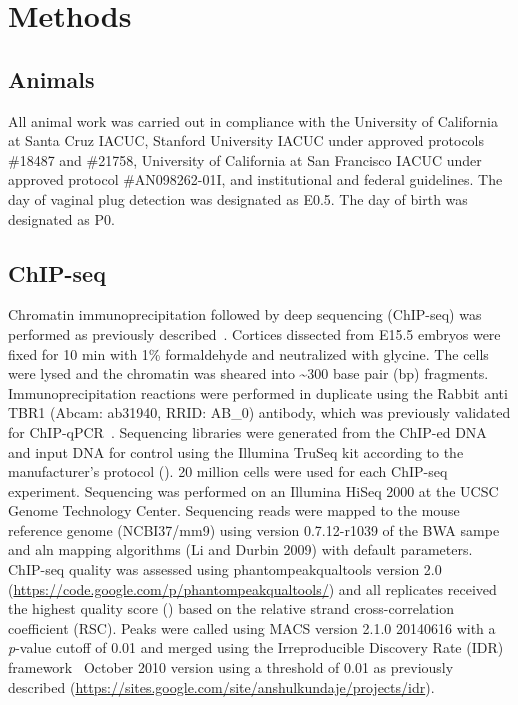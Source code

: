\section{Methods}
\label{sec:autismMethods}

\subsection{Animals}

All animal work was carried out in compliance with the University of
California at Santa Cruz IACUC, Stanford University IACUC under approved
protocols \#18487 and \#21758, University of California at San Francisco
IACUC under approved protocol \#AN098262-01I, and institutional and
federal guidelines. The day of vaginal plug detection was designated as
E0.5. The day of birth was designated as P0.

\subsection{ChIP-seq}

Chromatin immunoprecipitation followed by deep sequencing (ChIP-seq) was
performed as previously described~\citep{Eckler:2014jd, McKenna:2011ew}. Cortices dissected from E15.5 embryos were fixed for 10 min with
1\% formaldehyde and neutralized with glycine. The cells were lysed and
the chromatin was sheared into \textasciitilde{}300 base pair (bp)
fragments. Immunoprecipitation reactions were performed in duplicate
using the Rabbit anti TBR1 (Abcam: ab31940, RRID: AB\_0) antibody, which
was previously validated for ChIP-qPCR~\citep{McKenna:2011ew}.
Sequencing libraries were generated from the ChIP-ed DNA and input DNA
for control using the Illumina TruSeq kit according to the
manufacturer's protocol (). 20 million cells were
used for each ChIP-seq experiment. Sequencing was performed on an
Illumina HiSeq 2000 at the UCSC Genome Technology Center. Sequencing
reads were mapped to the mouse reference genome (NCBI37/mm9) using
version 0.7.12-r1039 of the BWA sampe and aln mapping algorithms (Li and
Durbin 2009) with default parameters. ChIP-seq quality was assessed
using phantompeakqualtools version 2.0
(\url{https://code.google.com/p/phantompeakqualtools/}) and all replicates
received the highest quality score () based on the
relative strand cross-correlation coefficient (RSC). Peaks were called
using MACS version 2.1.0 20140616 with a \emph{p}-value cutoff of 0.01
and merged using the Irreproducible Discovery Rate (IDR) framework~\citep{Li:2011eo} October 2010 version using a threshold of 0.01 as
previously described
(\url{https://sites.google.com/site/anshulkundaje/projects/idr}).

